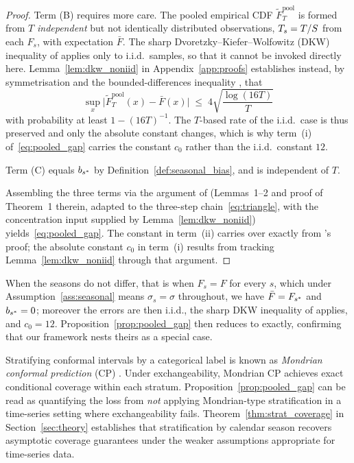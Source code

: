 \begin{proof}
Term (B) requires more care.  The pooled empirical CDF
$\tilde{F}_T^{\text{pool}}$ is formed from $T$ \emph{independent} but
not identically distributed observations, $T_s = T/S$ from each
$F_s$, with expectation $\bar{F}$.  The sharp
Dvoretzky--Kiefer--Wolfowitz (DKW) inequality of
\citet{massart1990tight} applies only to i.i.d.\ samples, so that it
cannot be invoked directly here.  Lemma~\ref{lem:dkw_noniid} in
Appendix~\ref{app:proofs} establishes instead, by symmetrisation and
the bounded-differences inequality
\citep{boucheron2013concentration}, that
\[
  \sup_x\bigl|\tilde{F}_T^{\text{pool}}(x) - \bar{F}(x)\bigr|
  \;\leq\;
  4\sqrt{\frac{\log(16T)}{T}}
\]
with probability at least $1 - (16T)^{-1}$.  The $T$-based rate of
the i.i.d.\ case is thus preserved and only the absolute constant
changes, which is why term~(i) of~\eqref{eq:pooled_gap} carries the
constant $c_0$ rather than the i.i.d.\ constant $12$.

Term (C) equals $b_{s^*}$ by
Definition~\ref{def:seasonal_bias}, and is independent of $T$.

Assembling the three terms via the argument of
\citet{xu2023conformal} (Lemmas~1--2 and proof of Theorem~1
therein, adapted to the three-step chain~\eqref{eq:triangle},
with the concentration input supplied by
Lemma~\ref{lem:dkw_noniid}) yields~\eqref{eq:pooled_gap}.
The constant in term~(ii) carries over exactly from
\citeauthor{xu2023conformal}'s proof; the absolute constant
$c_0$ in term~(i) results from tracking
Lemma~\ref{lem:dkw_noniid} through that argument.
\end{proof}

\begin{remark}
When the seasons do not differ, that is when $F_s = F$ for every $s$,
which under Assumption~\ref{ass:seasonal} means
$\sigma_s = \sigma$ throughout, we have $\bar{F} = F_{s^*}$ and
$b_{s^*} = 0$;
moreover the errors are then i.i.d., the sharp DKW inequality of
\citet{massart1990tight} applies, and $c_0 = 12$.
Proposition~\ref{prop:pooled_gap} then reduces to
\citet[Theorem~1]{xu2023conformal} exactly, confirming that our
framework nests theirs as a special case.
\end{remark}

\begin{remark}
\label{rem:mondrian}
Stratifying conformal intervals by a categorical label is known as
\emph{Mondrian conformal prediction} (CP) \citep{vovk2005mondrian}.
Under exchangeability, Mondrian CP achieves exact conditional
coverage within each stratum.  Proposition~\ref{prop:pooled_gap}
can be read as quantifying the loss from \emph{not} applying
Mondrian-type stratification in a time-series setting where
exchangeability fails.  Theorem~\ref{thm:strat_coverage}
in Section~\ref{sec:theory} establishes that stratification by
calendar season recovers asymptotic coverage guarantees under
the weaker assumptions appropriate for time-series data.
\end{remark}

